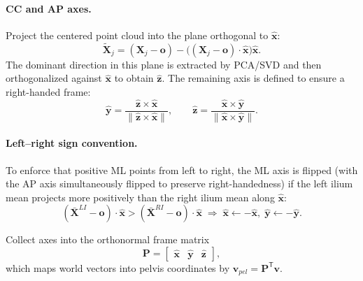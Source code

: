 \paragraph{CC and AP axes.}
Project the centered point cloud into the plane orthogonal to $\hat{\mathbf{x}}$:
\begin{equation}
\tilde{\mathbf{X}}_j=(\mathbf{X}_j-\mathbf{o})-\big((\mathbf{X}_j-\mathbf{o})\cdot\hat{\mathbf{x}}\big)\hat{\mathbf{x}}.
\end{equation}
The dominant direction in this plane is extracted by PCA/SVD and then orthogonalized against $\hat{\mathbf{x}}$ to obtain $\hat{\mathbf{z}}$.
The remaining axis is defined to ensure a right-handed frame:
\begin{equation}
\hat{\mathbf{y}}=\frac{\hat{\mathbf{z}}\times\hat{\mathbf{x}}}{\|\hat{\mathbf{z}}\times\hat{\mathbf{x}}\|},
\qquad
\hat{\mathbf{z}}=\frac{\hat{\mathbf{x}}\times\hat{\mathbf{y}}}{\|\hat{\mathbf{x}}\times\hat{\mathbf{y}}\|}.
\end{equation}

\paragraph{Left--right sign convention.}
To enforce that positive ML points from left to right, the ML axis is flipped (with the AP axis simultaneously flipped to preserve right-handedness) if the left ilium mean projects more positively than the right ilium mean along $\hat{\mathbf{x}}$:
\begin{equation}
(\bar{\mathbf{X}}^{LI}-\mathbf{o})\cdot\hat{\mathbf{x}} > (\bar{\mathbf{X}}^{RI}-\mathbf{o})\cdot\hat{\mathbf{x}}
\;\Rightarrow\;
\hat{\mathbf{x}}\leftarrow-\hat{\mathbf{x}},\;
\hat{\mathbf{y}}\leftarrow-\hat{\mathbf{y}}.
\end{equation}

Collect axes into the orthonormal frame matrix
\begin{equation}
\mathbf{P}=\begin{bmatrix}\hat{\mathbf{x}} & \hat{\mathbf{y}} & \hat{\mathbf{z}}\end{bmatrix},
\end{equation}
which maps world vectors into pelvis coordinates by $\mathbf{v}_{pel}=\mathbf{P}^\mathsf{T}\mathbf{v}$.

